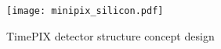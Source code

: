 %

\begin{figure}[H]
    \centering
    \texttt{[image: minipix\_silicon.pdf]} %
    \caption{TimePIX detector structure concept design \cite{TimePIX} }
    \label{fig:minipix_silicon}
\end{figure}

